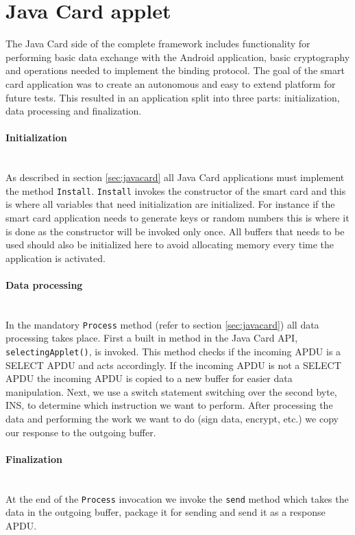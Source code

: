 \section{Java Card applet}
The Java Card side of the complete framework includes functionality for performing basic data exchange with the Android application, basic cryptography and operations needed to implement the binding protocol. The goal of the smart card application was to create an autonomous and easy to extend platform for future tests. This resulted in an application split into three parts: initialization, data processing and finalization.

\paragraph{Initialization}\mbox{}\\
As described in section \ref{sec:javacard} all Java Card applications must implement the method \texttt{Install}. \texttt{Install} invokes the constructor of the smart card and this is where all variables that need initialization are initialized. For instance if the smart card application needs to generate keys or random numbers this is where it is done as the constructor will be invoked only once. All buffers that needs to be used should also be initialized here to avoid allocating memory every time the application is activated.

\paragraph{Data processing}\mbox{}\\
In the mandatory \texttt{Process} method (refer to section \ref{sec:javacard}) all data processing takes place. First a built in method in the Java Card API, \texttt{selectingApplet()}, is invoked. This method checks if the incoming APDU is a SELECT APDU and acts accordingly. If the incoming APDU is not a SELECT APDU the incoming APDU is copied to a new buffer for easier data manipulation. Next, we use a switch statement switching over the second byte, INS, to determine which instruction we want to perform. After processing the data and performing the work we want to do (sign data, encrypt, etc.) we copy our response to the outgoing buffer.

\paragraph{Finalization}\mbox{}\\
At the end of the \texttt{Process} invocation we invoke the \texttt{send} method which takes the data in the outgoing buffer, package it for sending and send it as a response APDU.

